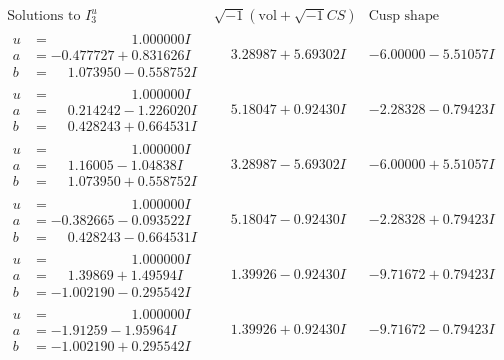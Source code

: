\documentclass[1p]{elsarticle_modified}
\theoremstyle{definition}
\newcommand{\I}{\sqrt{-1}}
\begin{document}
$$\begin{array}{c|c|c}  
\text{Solutions to }I^u_{3}& \I (\text{vol} + \sqrt{-1}CS) & \text{Cusp shape}\\
 \hline 
\begin{aligned}
u &= \phantom{-0.000000 -}1.000000 I \\
a &= -0.477727 + 0.831626 I \\
b &= \phantom{-}1.073950 - 0.558752 I\end{aligned}
 & \phantom{-}3.28987 + 5.69302 I & -6.00000 - 5.51057 I \\ \hline\begin{aligned}
u &= \phantom{-0.000000 -}1.000000 I \\
a &= \phantom{-}0.214242 - 1.226020 I \\
b &= \phantom{-}0.428243 + 0.664531 I\end{aligned}
 & \phantom{-}5.18047 + 0.92430 I & -2.28328 - 0.79423 I \\ \hline\begin{aligned}
u &= \phantom{-0.000000 -}1.000000 I \\
a &= \phantom{-}1.16005 - 1.04838 I \\
b &= \phantom{-}1.073950 + 0.558752 I\end{aligned}
 & \phantom{-}3.28987 - 5.69302 I & -6.00000 + 5.51057 I \\ \hline\begin{aligned}
u &= \phantom{-0.000000 -}1.000000 I \\
a &= -0.382665 - 0.093522 I \\
b &= \phantom{-}0.428243 - 0.664531 I\end{aligned}
 & \phantom{-}5.18047 - 0.92430 I & -2.28328 + 0.79423 I \\ \hline\begin{aligned}
u &= \phantom{-0.000000 -}1.000000 I \\
a &= \phantom{-}1.39869 + 1.49594 I \\
b &= -1.002190 - 0.295542 I\end{aligned}
 & \phantom{-}1.39926 - 0.92430 I & -9.71672 + 0.79423 I \\ \hline\begin{aligned}
u &= \phantom{-0.000000 -}1.000000 I \\
a &= -1.91259 - 1.95964 I \\
b &= -1.002190 + 0.295542 I\end{aligned}
 & \phantom{-}1.39926 + 0.92430 I & -9.71672 - 0.79423 I \\ \hline\begin{aligned}

\end{aligned}
\end{array}$$
\end{document}
